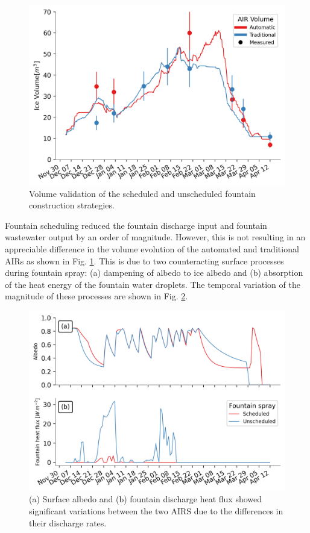 \begin{figure}[htb] \includegraphics[width=12cm] {figs/CH_validation.png} 
  \caption{Volume validation of the scheduled and unscheduled fountain construction strategies.} \label{fig:validation} \end{figure}


Fountain scheduling reduced the fountain discharge input and fountain wastewater output by an order of
magnitude. However, this is not resulting in an appreciable difference in the volume evolution of the automated
and traditional AIRs as shown in Fig. \ref{fig:validation}. This is due to two counteracting surface processes
during fountain spray: (a) dampening of albedo to ice albedo and (b) absorption of the heat energy of the
fountain water droplets. The temporal variation of the magnitude of these processes are shown in Fig.
\ref{fig:dis_processes}.

\begin{figure}[htb]
\includegraphics[width=12cm]{figs/dis_processes.png}
\caption{(a) Surface albedo  and (b) fountain discharge heat flux showed significant variations between the two
  AIRS due to the differences in their discharge rates.}
\label{fig:dis_processes}
\end{figure}

